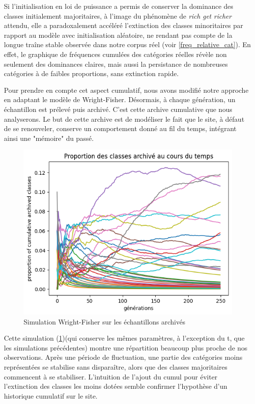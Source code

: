 \documentclass[12pt,a4paper,oneside,titlepage]{book} %
\begin{document}
Si l'initialisation en loi de puissance a permis de conserver la dominance des classes initialement majoritaires, à l'image du phénomène de \textit{rich get richer} attendu, elle a paradoxalement accéléré l'extinction des classes minoritaires par rapport au modèle avec initialisation aléatoire, ne rendant pas compte de la longue traîne stable observée dans notre corpus réel (voir \ref{freq_relative_cat}). En effet, le graphique de fréquences cumulées des catégories réelles révèle non seulement des dominances claires, mais aussi la persistance de nombreuses catégories à de faibles proportions, sans extinction rapide.

Pour prendre en compte cet aspect cumulatif, nous avons modifié notre approche en adaptant le modèle de Wright-Fisher. Désormais, à chaque génération, un échantillon est prélevé puis archivé. C'est cette archive cumulative que nous analyserons. Le but de cette archive est de modéliser le fait que le site, à défaut de se renouveler, conserve un comportement donné au fil du temps, intégrant ainsi une "mémoire" du passé.


\begin{figure}
    \centering
    \includegraphics[width=0.5\linewidth]{illustration/wf_archive`.png}
    \caption{Simulation Wright-Fisher sur les échantillons archivés}
    \label{fig:wf_archive}
\end{figure}

Cette simulation (\ref{fig:wf_archive})(qui conserve les mêmes paramètres, à l'exception du t, que les simulations précédentes) montre une répartition beaucoup plus proche de nos observations. Après une période de fluctuation, une partie des catégories moins représentées se stabilise sans disparaître, alors que des classes majoritaires commencent à se stabiliser. L'intuition de l'ajout du cumul pour éviter l'extinction des classes les moins dotées semble confirmer l'hypothèse d'un historique cumulatif sur le site. 
\end{document}
